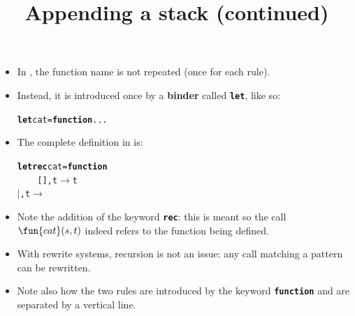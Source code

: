 \documentclass[wide]{slides}
\begin{document}
\begin{slide}
  \title{Appending a stack (continued)}

  \begin{itemize}

    \item In \OCaml, the function name is not repeated (once for each
      rule).

    \item Instead, it is introduced once by a \textbf{binder} called
      \textbf{\texttt{let}}, like so:
\begin{alltt}
\textbf{let} cat = \textbf{function} ...
\end{alltt}

     \item The complete definition in \OCaml is:
\begin{alltt}
\textbf{let} \textbf{rec} cat = \textbf{function}
\ \ \ \ [], t \(\rightarrow\) t
\(\mid\) , t \(\rightarrow\) 
\end{alltt}

     \item Note the addition of the keyword \textbf{\texttt{rec}}:
       this is meant so the call \(\fun{cat}(s,t)\) indeed refers to
       the function being defined.

     \item With rewrite systems, recursion is not an issue: any call
       matching a pattern can be rewritten.

     \item Note also how the two rules are introduced by the keyword
       \textbf{\texttt{function}} and are separated by a vertical
       line.
  \end{itemize}

\end{slide}
\end{document}
